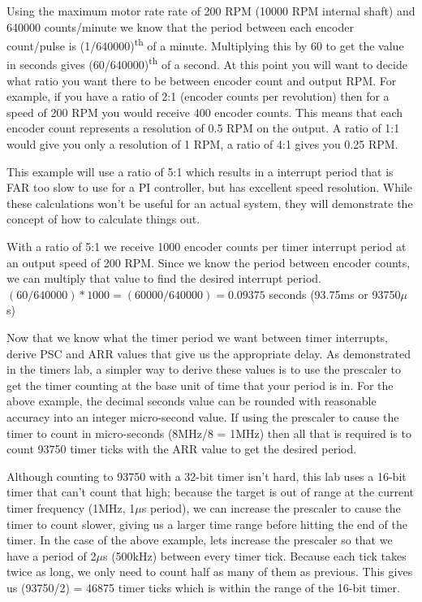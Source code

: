 \documentclass[openany,11pt,fleqn]{book} %
\begin{document}
Using the maximum motor rate rate of 200 RPM (10000 RPM internal shaft) and 640000 counts/minute we know that the period between each encoder count/pulse is (1/640000)\textsuperscript{th} of a minute. Multiplying this by 60 to get the value in seconds gives (60/640000)\textsuperscript{th} of a second. 
At this point you will want to decide what ratio you want there to be between encoder count and output RPM. For example, if you have a ratio of 2:1 (encoder counts per revolution) then for a speed of 200 RPM you would receive 400 encoder counts. This means that each encoder count represents a resolution of 0.5 RPM on the output. A ratio of 1:1 would give you only a resolution of 1 RPM, a ratio of 4:1 gives you 0.25 RPM. 

This example will use a ratio of 5:1 which results in a interrupt period that is FAR too slow to use for a PI controller, but has excellent speed resolution. While these calculations won't be useful for an actual system, they will demonstrate the concept of how to calculate things out. 

With a ratio of 5:1 we receive 1000 encoder counts per timer interrupt period at an output speed of 200 RPM. Since we know the period between encoder counts, we can multiply that value to find the desired interrupt period. $(60/640000)*1000 = (60000/640000) = 0.09375$ seconds (93.75ms or 93750$\mu$s)

Now that we know what the timer period we want between timer interrupts, derive PSC and ARR values that give us the appropriate delay. As demonstrated in the timers lab, a simpler way to derive these values is to use the prescaler to get the timer counting at the base unit of time that your period is in. For the above example, the decimal seconds value can be rounded with reasonable accuracy into an integer micro-second value. If using the prescaler to cause the timer to count in micro-seconds (8MHz/8 = 1MHz) then all that is required is to count 93750 timer ticks with the ARR value to get the desired period. 

Although counting to 93750 with a 32-bit timer isn't hard, this lab uses a 16-bit timer that can't count that high; because the target is out of range at the current timer frequency (1MHz, 1$\mu$s period), we can increase the prescaler to cause the timer to count slower, giving us a larger time range before hitting the end of the timer. In the case of the above example, lets increase the prescaler so that we have a period of 2$\mu$s (500kHz) between every timer tick. Because each tick takes twice as long, we only need to count half as many of them as previous. This gives us (93750/2) = 46875 timer ticks which is within the range of the 16-bit timer.
\end{document}
